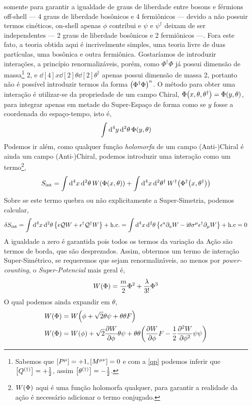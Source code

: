 somente para garantir a igualdade de graus de liberdade entre bosons e férmions off-shell --- 4 graus de liberdade bosônicos e 4 fermiônicos --- devido a não possuir termos cinéticos, on-shell apenas $\phi$ contribui e $\psi$ e $\psi^\dagger$ deixam de ser independentes --- 2 graus 
de liberdade bosônicos e 2 fermiônicos ---. Fora este fato, a teoria obtida aqui é incrivelmente simples, uma teoria livre de duas partículas, uma bosônica e outra fermiônica. Gostaríamos de introduzir interações, a princípio renormalizáveis, porém, como $\Phi^\dagger\Phi$ já possui dimensão de 
massa\footnote{Sabemos que $\qty[P^\mu]=+1,\qty[M^{\mu\nu}]=0$ e com a \cref{qp} podemos inferir que $\qty[Q^{\qty(\dagger)}]=+\frac12$, assim $\qty[\theta^{\qty(\dagger)}]=-\frac12$.} 2, e $\dd[4]{x}\dd[2]{\theta}\dd[2]{\theta^\dagger}$ apenas possui dimensão de massa 2, portanto não é possível introduzir termos da forma $\qty(\Phi^\dagger\Phi)^n$. O 
método para obter uma interação é utilizar-se da propriedade de um campo Chiral, $\Phi\qty(x,\theta,\theta^\dagger)=\Phi\qty(y,\theta)$, para integrar apenas em metade do Super-Espaço de forma como se $y$ fosse a coordenada do espaço-tempo, isto é,\[\int\dd[4]{y}\dd[2]{\theta}\Phi\qty(y,\theta)\] Podemos ir além, 
como qualquer função \textit{holomorfa} de um campo (Anti-)Chiral é ainda um campo (Anti-)Chiral, podemos introduzir uma interação como um termo\footnote{$W\qty(\Phi)$ aqui é uma função holomorfa qualquer, para garantir a realidade da ação é necessário adicionar o termo conjugado.},\[S_{\textnormal{int}}=\int\dd[4]{x}\dd[2]{\theta}W\qty(\Phi\qty(x,\theta))+\int\dd[4]{x}\dd[2]{\theta^\dagger}W^\dagger\qty(\Phi^\dagger\qty(x,\theta^\dagger))\] Sobre se este termo quebra ou não explicitamente a Super-Simetria, 
podemos calcular,\[\delta S_{\textnormal{int}}=\int\dd[4]{x}\dd[2]{\theta}\qty{\epsilon\mathcal Q W+\epsilon^\dagger\mathcal Q^\dagger W}+\textnormal{h.c.}=\int\dd[4]{x}\dd[2]{\theta}\qty{\epsilon^a\partial_a W-\textnormal{i}\theta\sigma^\mu\epsilon^\dagger\partial_\mu W}+\textnormal{h.c}=0\] A igualdade a zero é garantida pois todos os termos da variação da 
Ação são termos de borda, que são desprezados. Assim, obtermos um termo de interação Super-Simétrico, se requeremos que sejam renormalizáveis, ao menos por \textit{power-counting}, o \textit{Super-Potencial} mais geral é,\[W\qty(\Phi)=\frac m2\Phi^2+\frac{\lambda}{3!}\Phi^3\] O qual podemos ainda expandir em $\theta$,
\begin{align*}
    W\qty(\Phi)&=W\qty(\phi+\sqrt 2\theta\psi+\theta\theta F)\\
    W\qty(\Phi)&=W\qty(\phi)+\sqrt 2\pdv{W}{\phi}\theta\psi+\theta\theta\qty(\pdv {W}{\phi} F-\frac12\pdv[2]{W}{\phi}\psi\psi)
\end{align*}
